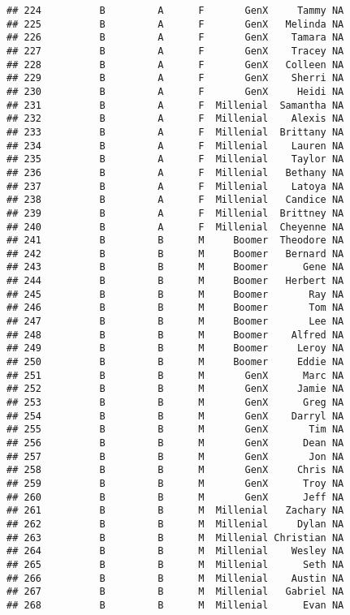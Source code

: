 \documentclass[
]{article}
\begin{document}
\begin{verbatim}
## 224          B         A      F       GenX     Tammy NA
## 225          B         A      F       GenX   Melinda NA
## 226          B         A      F       GenX    Tamara NA
## 227          B         A      F       GenX    Tracey NA
## 228          B         A      F       GenX   Colleen NA
## 229          B         A      F       GenX    Sherri NA
## 230          B         A      F       GenX     Heidi NA
## 231          B         A      F  Millenial  Samantha NA
## 232          B         A      F  Millenial    Alexis NA
## 233          B         A      F  Millenial  Brittany NA
## 234          B         A      F  Millenial    Lauren NA
## 235          B         A      F  Millenial    Taylor NA
## 236          B         A      F  Millenial   Bethany NA
## 237          B         A      F  Millenial    Latoya NA
## 238          B         A      F  Millenial   Candice NA
## 239          B         A      F  Millenial  Brittney NA
## 240          B         A      F  Millenial  Cheyenne NA
## 241          B         B      M     Boomer  Theodore NA
## 242          B         B      M     Boomer   Bernard NA
## 243          B         B      M     Boomer      Gene NA
## 244          B         B      M     Boomer   Herbert NA
## 245          B         B      M     Boomer       Ray NA
## 246          B         B      M     Boomer       Tom NA
## 247          B         B      M     Boomer       Lee NA
## 248          B         B      M     Boomer    Alfred NA
## 249          B         B      M     Boomer     Leroy NA
## 250          B         B      M     Boomer     Eddie NA
## 251          B         B      M       GenX      Marc NA
## 252          B         B      M       GenX     Jamie NA
## 253          B         B      M       GenX      Greg NA
## 254          B         B      M       GenX    Darryl NA
## 255          B         B      M       GenX       Tim NA
## 256          B         B      M       GenX      Dean NA
## 257          B         B      M       GenX       Jon NA
## 258          B         B      M       GenX     Chris NA
## 259          B         B      M       GenX      Troy NA
## 260          B         B      M       GenX      Jeff NA
## 261          B         B      M  Millenial   Zachary NA
## 262          B         B      M  Millenial     Dylan NA
## 263          B         B      M  Millenial Christian NA
## 264          B         B      M  Millenial    Wesley NA
## 265          B         B      M  Millenial      Seth NA
## 266          B         B      M  Millenial    Austin NA
## 267          B         B      M  Millenial   Gabriel NA
## 268          B         B      M  Millenial      Evan NA

\end{verbatim}
\end{document}
